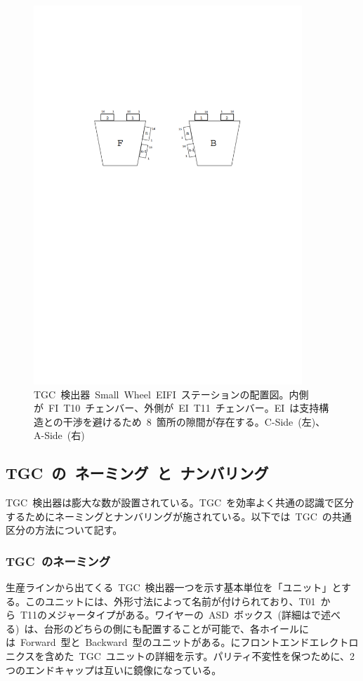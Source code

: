 \begin{figure}[H]
        \centering   
        \includegraphics[width=0.9\textwidth,page=4]{img/pdf/TGC.pdf}
        \caption[TGC 検出器~Small~Wheel~EIFI~ステーションの配置図]{TGC~検出器~Small~Wheel~EIFI~ステーションの配置図。内側が~FI~T10~チェンバー、外側が~EI~T11~チェンバー。EI~は支持構造との干渉を避けるため~8~箇所の隙間が存在する。C-Side~(左)、A-Side~(右)~\cite{TR:02}}
        \label{fig:tgcSW}
\end{figure}

\subsection{TGC~の~ネーミング~と~ナンバリング}
TGC~検出器は膨大な数が設置されている。TGC~を効率よく共通の認識で区分するためにネーミングとナンバリングが施されている。以下では~TGC~の共通区分の方法について記す。
\subsubsection{TGC~のネーミング}
生産ラインから出てくる~TGC~検出器一つを示す基本単位を「ユニット」とする。このユニットには、外形寸法によって名前が付けられており、T01~から~T11のメジャータイプがある。ワイヤーの~ASD~ボックス~(詳細はで述べる)~は、台形のどちらの側にも配置することが可能で、各ホイールには~Forward~型と~Backward~型のユニットがある。にフロントエンドエレクトロニクスを含めた~TGC~ユニットの詳細を示す。パリティ不変性を保つために、2つのエンドキャップは互いに鏡像になっている。

